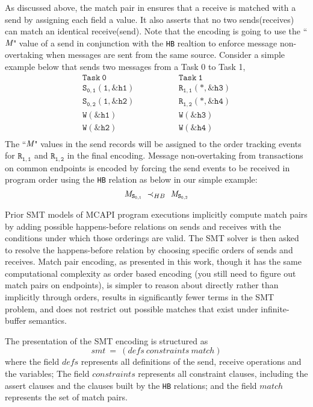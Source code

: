 As discussed above, the match pair in  ensures that a receive is matched with a send by assigning each field a value. It also asserts that no two sends(receives) can match an identical receive(send). Note that the encoding is going to use the ``$\emph{M}$"  value of a send in conjunction with the \texttt{HB} realtion to enforce message non-overtaking when messages are sent from the same source. Consider a simple example below that sends two messages from a Task 0 to Task 1,
\[
\begin{array}{l|l}
\;\;\;\;\;\;\;\;\mathtt{Task\ 0}\;\;\;\;\;\;\;\; & \;\;\;\;\;\;\;\; \mathtt{Task\ 1}\;\;\;\;\;\;\;\; \\
\hline
\;\;\;\;\;\;\;\;\mathtt{S_{0,1}(1,\&h1)}\;\;\;\;\;\;\;\; & \;\;\;\;\;\;\;\; \mathtt{R_{1,1}(*,\&h3)}\;\;\;\;\;\;\;\; \\
\;\;\;\;\;\;\;\;\mathtt{S_{0,2}(1,\&h2)}\;\;\;\;\;\;\;\; & \;\;\;\;\;\;\;\; \mathtt{R_{1,2}(*,\&h4)}\;\;\;\;\;\;\;\; \\
\;\;\;\;\;\;\;\;\mathtt{W(\&h1)}\;\;\;\;\;\;\;\; & \;\;\;\;\;\;\;\; \mathtt{W(\&h3)}\;\;\;\;\;\;\;\; \\
\;\;\;\;\;\;\;\;\mathtt{W(\&h2)}\;\;\;\;\;\;\;\; & \;\;\;\;\;\;\;\; \mathtt{W(\&h4)}\;\;\;\;\;\;\;\; \\
\end{array}
\]
The ``$\emph{M}$" values in the send records will be assigned to the order tracking events for $\mathtt{R_{1,1}}$ and $\mathtt{R_{1,2}}$ in the final encoding. Message non-overtaking from transactions on common endpoints is encoded by forcing the send events to be received in program order using the \texttt{HB} relation as below in our simple example:
\[\cfgnt{M}_\mathtt{S_{0,1}}\ \prec_{HB}\ \cfgnt{M}_\mathtt{S_{0,2}}\]

Prior SMT models of MCAPI program executions implicitly compute
match pairs by adding possible happens-before relations on sends and
receives with the conditions under which those orderings are
valid. The SMT solver is then asked to resolve the happens-before
relation by choosing specific orders of sends and receives. Match pair
encoding, as presented in this work, though it has the same
computational complexity as order based encoding (you still need to
figure out match pairs on endpoints), is simpler to reason about
directly rather than implicitly through orders, results in
significantly fewer terms in the SMT problem, and does not restrict out possible matches that exist under infinite-buffer semantics.

The presentation of the SMT encoding is structured as
\[\mathit{smt}\ =\ (\mathit{defs}\ \mathit{constraints}\ \mathit{match})\]
where the field $\mathit{defs}$ represents all definitions of the send, receive operations and the variables; The field $\mathit{constraints}$ represents all constraint clauses, including the assert clauses and the clauses built by the \texttt{HB} relations; and the field $\mathit{match}$ represents the set of match pairs.

